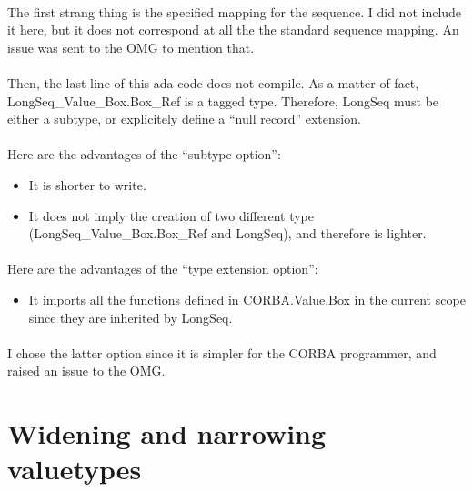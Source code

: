 \paragraph{}The first strang thing is the specified mapping for the
sequence. I did not include it here, but it does not correspond at
all the the standard sequence mapping. An issue was sent to the OMG to
mention that.

\paragraph{}Then, the last line of this ada code does not compile. As
a matter of fact, LongSeq\_Value\_Box.Box\_Ref is a tagged
type. Therefore, LongSeq must be either a subtype, or explicitely
define a ``null record'' extension.

\paragraph{}Here are the advantages of the ``subtype option'':
\begin{itemize}
\item It is shorter to write.
\item It does not imply the creation of two different type
(LongSeq\_Value\_Box.Box\_Ref and LongSeq), and therefore is lighter.
\end{itemize}

\paragraph{}Here are the advantages of the ``type extension option'':
\begin{itemize}
\item It imports all the functions defined in CORBA.Value.Box in the
current scope since they are inherited by LongSeq.
\end{itemize}

\paragraph{} I chose the latter option since it is simpler for the
CORBA programmer, and raised an issue to the OMG.

\section{Widening and narrowing valuetypes}

